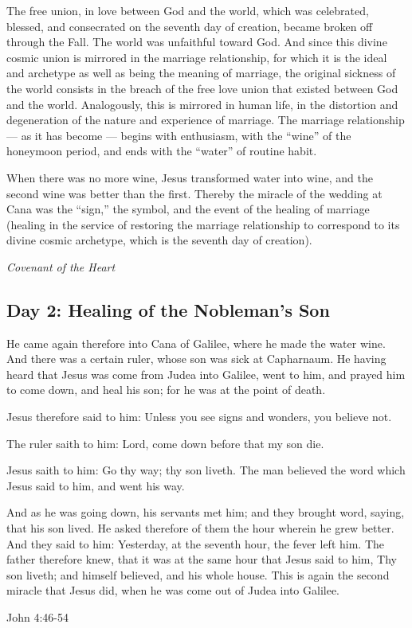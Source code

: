 The free union, in love between God and the world, which was celebrated, blessed, and consecrated on the seventh day of
creation, became broken off through the Fall. The world was unfaithful toward God. And since this divine cosmic union
is mirrored in the marriage relationship, for which it is the ideal and archetype as well as being the meaning of
marriage, the original sickness of the world consists in the breach of the free love union that existed between God and
the world. Analogously, this is mirrored in human life, in the distortion and degeneration of the nature and experience
of marriage. The marriage relationship — as it has become — begins with
enthusiasm, with the “wine” of the honeymoon period, and ends with the “water” of routine habit.

\begin{quotationx}
When there was no more wine, Jesus transformed water into wine, and the second wine was better than the first. Thereby
the miracle of the wedding at Cana was the “sign,” the symbol, and the event of the healing of marriage (healing in the
service of restoring the marriage relationship to correspond to its divine cosmic archetype, which is the seventh day
of creation). \begin{flushright} \emph{Covenant of the Heart}\end{flushright}

\end{quotationx}
\subsection*{Day 2: Healing of the Nobleman's Son}
He came again therefore into Cana of Galilee, where he made the water wine. And there was a certain ruler, whose son was
sick at Capharnaum. He having heard that Jesus was come from Judea into Galilee, went to him, and prayed him to come
down, and heal his son; for he was at the point of death.

Jesus therefore said to him: Unless you see signs and wonders, you believe not.

The ruler saith to him: Lord, come down before that my son die.

Jesus saith to him: Go thy way; thy son liveth. The man believed the word which Jesus said to him, and went his way.

And as he was going down, his servants met him; and they brought word, saying, that his son lived. He asked therefore of
them the hour wherein he grew better. And they said to him: Yesterday, at the seventh hour, the fever left him. The
father therefore knew, that it was at the same hour that Jesus said to him, Thy son liveth; and himself believed, and
his whole house. This is again the second miracle that Jesus did, when he was come out of Judea into Galilee.  \begin{flushright}
John 4:46-54\end{flushright}

